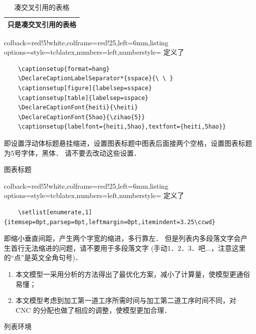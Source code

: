 \documentclass{JXUSTmodeling}
\begin{document}
\begin{table}[htbp]
    \centering
    \caption{凑交叉引用的表格}\label{tab:1}
    \begin{tabular}{c}
        \hline
        只是凑交叉引用的表格\\
        \hline
    \end{tabular}
\end{table}

\begin{example}[htbp]
        \centering
        \begin{tcblisting}{colback=red!5!white,colframe=red!25,left=6mm,listing options={style=tcblatex,numbers=left,numberstyle=\tiny\color{red!75!black}}}
定义了
\begin{verbatim}
    \captionsetup{format=hang}
    \DeclareCaptionLabelSeparator*{sspace}{\ \ }
    \captionsetup[figure]{labelsep=sspace}
    \captionsetup[table]{labelsep=sspace}
    \DeclareCaptionFont{heiti}{\heiti}
    \DeclareCaptionFont{5hao}{\zihao{5}}
    \captionsetup{labelfont={heiti,5hao},textfont={heiti,5hao}}
\end{verbatim}
即设置浮动体标题悬挂缩进，设置图表标题中图表后面接两个空格，设置图表标题为5号字体，黑体．
请不要去改动这些设置．
        \end{tcblisting}
        \caption{图表标题}\label{exam:7}
\end{example}

\begin{example}[htbp]
    \centering
    \begin{tcblisting}{colback=red!5!white,colframe=red!25,left=6mm,listing options={style=tcblatex,numbers=left,numberstyle=\tiny\color{red!75!black}}}
定义了
\begin{verbatim}
    \setlist[enumerate,1]{itemsep=0pt,parsep=0pt,leftmargin=0pt,itemindent=3.25\ccwd}
\end{verbatim}
即缩小垂直间距，产生两个字宽的缩进，多行靠左． 但是列表内多段落文字会产生首行无法缩进的问题，请不要用于多段落文字 (手动1．2．3．吧$\ldots$，注意这里的“点”是英文全角句号)．
\begin{enumerate}
    \item 本文模型一采用分析的方法得出了最优化方案，减小了计算量，使模型更通俗易懂；
    \item 本文模型考虑到加工第一道工序所需时间与加工第二道工序时间不同，对 CNC 的分配也做了相应的调整，使模型更加合理．
\end{enumerate}
        \end{tcblisting}
        \caption{列表环境}\label{exam:8}
    \end{example}
\end{document}
